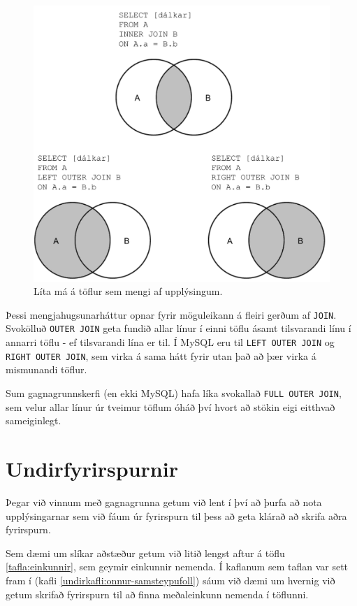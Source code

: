 \begin{figure}
\caption[Mengi]{Líta má á töflur sem mengi af upplýsingum.}
\label{mynd:join-mengi}
\centering
\includegraphics[width=\linewidth]{myndir/join-mengi}
\end{figure}

Þessi mengjahugsunarháttur opnar fyrir möguleikann á fleiri gerðum af \verb|JOIN|. Svokölluð \verb|OUTER JOIN| geta fundið allar línur í einni töflu ásamt tilsvarandi línu í annarri töflu - ef tilsvarandi lína er til. Í MySQL eru til \verb|LEFT OUTER JOIN| og \verb|RIGHT OUTER JOIN|, sem virka á sama hátt fyrir utan það að þær virka á mismunandi töflur.

Sum gagnagrunnskerfi (en ekki MySQL) hafa líka svokallað \verb|FULL OUTER JOIN|, sem velur allar línur úr tveimur töflum óháð því hvort að stökin eigi eitthvað sameiginlegt.

\section{Undirfyrirspurnir}
\label{undirkafli:undirfyrirspurnir}
Þegar við vinnum með gagnagrunna getum við lent í því að þurfa að nota upplýsingarnar sem við fáum úr fyrirspurn til þess að geta klárað að skrifa aðra fyrirspurn.

Sem dæmi um slíkar aðstæður getum við litið lengst aftur á töflu \ref{tafla:einkunnir}, sem geymir einkunnir nemenda. Í kaflanum sem taflan var sett fram í (kafli \ref{undirkafli:onnur-samsteypufoll}) sáum við dæmi um hvernig við getum skrifað fyrirspurn til að finna meðaleinkunn nemenda í töflunni. 

